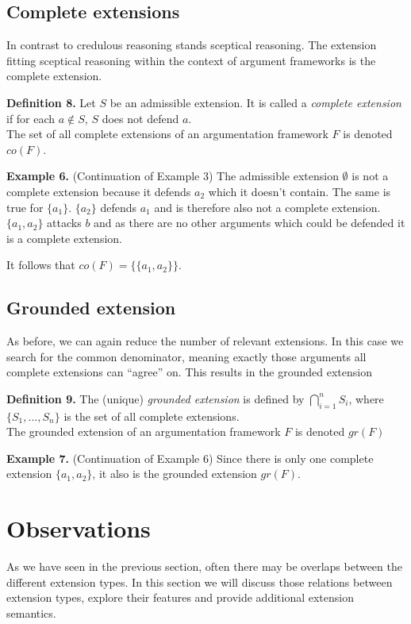 \documentclass[draft,final]{vutinfth} %
\newcommand{\hl}{\par\vspace{6pt}} %
\newcommand{\cl}{\par\vspace{12pt}} %
\begin{document}
\section{Complete extensions}

In contrast to credulous reasoning stands sceptical reasoning. The extension fitting sceptical reasoning within the context of argument frameworks is the complete extension.\cl

\textbf{Definition 8.} Let $S$ be an admissible extension. It is called a \emph{complete extension} if for each $a\not\in S$, $S$ does not defend $a$.\\
The set of all complete extensions of an argumentation framework $F$ is denoted $co(F)$.\cl

\textbf{Example 6.} (Continuation of Example 3) The admissible extension $\emptyset$ is not a complete extension because it defends $a_2$ which it doesn't contain. The same is true for $\{a_1\}$. $\{a_2\}$ defends $a_1$ and is therefore also not a complete extension.\\
$\{a_1,a_2\}$ attacks $b$ and as there are no other arguments which could be defended it is a complete extension.\hl
It follows that $co(F)=\{\{a_1,a_2\}\}$.\cl

\section{Grounded extension}

As before, we can again reduce the number of relevant extensions. In this case we search for the common denominator, meaning exactly those arguments all complete extensions can ``agree'' on. This results in the grounded extension\cl

\textbf{Definition 9.} The (unique) \emph{grounded extension} is defined by $\bigcap\limits_{i=1}^n{S_i}$, where $\{S_1,...,S_n\}$ is the set of all complete extensions.\\
The grounded extension of an argumentation framework $F$ is denoted $gr(F)$\cl

\textbf{Example 7.} (Continuation of Example 6) Since there is only one complete extension $\{a_1,a_2\}$, it also is the grounded extension $gr(F)$.\cl

\chapter{Observations} %

As we have seen in the previous section, often there may be overlaps between the different extension types. In this section we will discuss those relations between extension types, explore their features and provide additional extension semantics.\cl %
\end{document}
